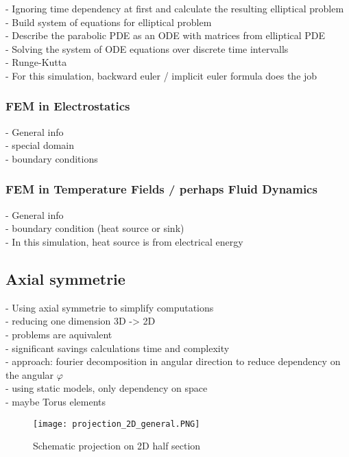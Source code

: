 \documentclass[parskip=half, titlepage=yes, 12pt, BCOR=12mm, DIV=calc]{scrartcl}
\begin{document}
- Ignoring time dependency at first and calculate the resulting elliptical problem \\
- Build system of equations for elliptical problem \\

- Describe the parabolic PDE as an ODE with matrices from elliptical PDE \\
- Solving the system of ODE equations over discrete time intervalls \\
- Runge-Kutta \\
- For this simulation, backward euler / implicit euler formula does the job \\

\subsubsection{FEM in Electrostatics}
- General info \\
- special domain \\
- boundary conditions \\

\subsubsection{FEM in Temperature Fields / perhaps Fluid Dynamics}
- General info \\
- boundary condition (heat source or sink) \\
- In this simulation, heat source is from electrical energy \\


\subsection{Axial symmetrie}
- Using axial symmetrie to simplify computations \\
- reducing one dimension 3D -> 2D \\
- problems are aquivalent \\
- significant savings calculations time and complexity \\
- approach: fourier decomposition in angular direction to reduce dependency on the angular $\varphi$ \\
- using static models, only dependency on space \\
- maybe Torus elements \\

\begin{figure}[H]
    \centering
    \texttt{[image: projection\_2D\_general.PNG]}
    \caption{Schematic projection on 2D half section}
    \label{projection_2D_general}
\end{figure}
\end{document}
